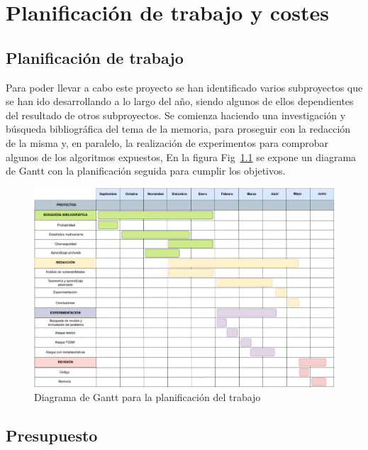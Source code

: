 
\chapter{ Planificación de trabajo y costes}\label{ap:apendicea}

\section{Planificación de trabajo}

Para poder llevar a cabo este proyecto se han identificado varios subproyectos que se han ido desarrollando a lo largo del año, siendo algunos de ellos dependientes del resultado de otros subproyectos. Se comienza haciendo una investigación y búsqueda bibliográfica del tema de la memoria, para proseguir con la redacción de la misma y, en paralelo, la realización de experimentos para comprobar algunos de los algoritmos expuestos, En la figura Fig~\ref{fig:gantt} se expone un diagrama de Gantt con la planificación seguida para cumplir los objetivos.

\begin{figure}[h]
    \centering
        \centering
        \includegraphics[width=\textwidth]{img/GanttTFG.jpg}
        \caption{Diagrama de Gantt para la planificación del trabajo}
        \label{fig:gantt}
\end{figure}

\newpage

\section{Presupuesto}

